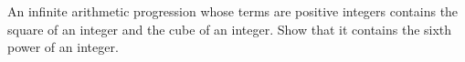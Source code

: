 An infinite arithmetic progression whose terms are positive integers contains the square of an integer and the cube of an integer. Show that it contains the sixth power of an integer.
